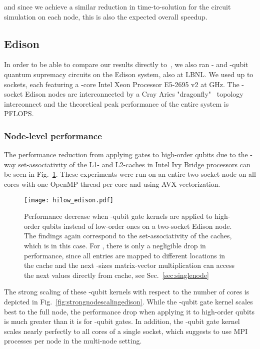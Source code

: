 \documentclass[sigconf]{acmart}
\begin{document}
and since we achieve a similar reduction in time-to-solution for the circuit simulation on each node, this is also the expected overall speedup.

\subsection{Edison}
In order to be able to compare our results directly to~\cite{boixo2016characterizing}, we also ran - and -qubit quantum supremacy circuits on the Edison system, also at LBNL. We used up to  sockets, each featuring a -core Intel\textregistered{} Xeon\textregistered{} Processor E5-2695 v2 at GHz. The  -socket Edison nodes are interconnected by a Cray Aries "dragonfly"~\cite{kim2008dragonfly} topology interconnect and the theoretical peak performance of the entire system is  PFLOPS.

\subsubsection{Node-level performance}
The performance reduction from applying gates to high-order qubits due to the -way set-associativity of the L1- and L2-caches in Intel\textregistered{} Ivy Bridge\texttrademark{} processors can be seen in Fig.~\ref{fig:hilowedison}. These experiments were run on an entire two-socket node on all  cores with one OpenMP thread per core and using AVX vectorization.

\begin{figure}[ht]
	\texttt{[image: hilow\_edison.pdf]}
	\caption{Performance decrease when -qubit gate kernels are applied to high-order qubits instead of low-order ones on a two-socket Edison node. The findings again correspond to the set-associativity of the caches, which is  in this case. For , there is only a negligible drop in performance, since all  entries are mapped to different locations in the cache and the next -sizes matrix-vector multiplication can access the next  values directly from cache, see Sec.~\ref{sec:singlenode}}
	\label{fig:hilowedison}
\end{figure}

The strong scaling of these -qubit kernels with respect to the number of cores is depicted in Fig.~\ref{fig:strongnodescalingedison}. While the -qubit gate kernel scales best to the full node, the performance drop when applying it to high-order qubits is much greater than it is for -qubit gates. In addition, the -qubit gate kernel scales nearly perfectly to all  cores of a single socket, which suggests to use  MPI processes per node in the multi-node setting.
\end{document}
